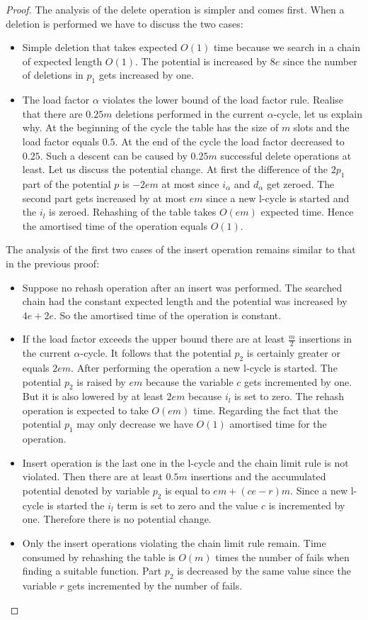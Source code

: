 \begin{proof}
The analysis of the delete operation is simpler and comes first. When a deletion is performed we have to discuss the two cases:
\begin{itemize}
\item Simple deletion that takes expected $O(1)$ time because we search in a chain of expected length $O(1)$. The potential is increased by $8e$ since the number of deletions in $p_1$ gets increased by one.
\item The load factor $\alpha$ violates the lower bound of the load factor rule. Realise that there are $0.25 m$ deletions performed in the current $\alpha$-cycle, let us explain why. At the beginning of the cycle the table has the size of $m$ slots and the load factor equals $0.5$. At the end of the cycle the load factor decreased to $0.25$. Such a descent can be caused by $0.25 m$ successful delete operations at least. Let us discuss the potential change. At first the difference of the $2p_1$ part of the potential $p$ is $-2em$ at most since $i_{\alpha}$ and $d_{\alpha}$ get zeroed. The second part gets increased by at most $em$ since a new l-cycle is started and the $i_l$ is zeroed. Rehashing of the table takes $O(em)$ expected time. Hence the amortised time of the operation equals $O(1)$. 
\end{itemize}

The analysis of the first two cases of the insert operation remains similar to that in the previous proof:
\begin{itemize}
\item Suppose no rehash operation after an insert was performed. The searched chain had the constant expected length and the potential was increased by $4e + 2e$. So the amortised time of the operation is constant.
\item If the load factor exceeds the upper bound there are at least $\frac{m}{2}$ insertions in the current $\alpha$-cycle. It follows that the potential $p_2$ is certainly greater or equals $2em$. After performing the operation a new l-cycle is started. The potential $p_2$ is raised by $em$ because the variable $c$ gets incremented by one. But it is also lowered by at least $2em$ because $i_l$ is set to zero. The rehash operation is expected to take $O(em)$ time. Regarding the fact that the potential $p_1$ may only decrease we have $O(1)$ amortised time for the operation.
\item Insert operation is the last one in the l-cycle and the chain limit rule is not violated. Then there are at least $0.5 m$ insertions and the accumulated potential denoted by variable $p_2$ is equal to $em + (ce - r)m$. Since a new l-cycle is started the $i_l$ term is set to zero and the value $c$ is incremented by one. Therefore there is no potential change.
\item Only the insert operations violating the chain limit rule remain. Time consumed by rehashing the table is $O(m)$ times the number of fails when finding a suitable function. Part $p_2$ is decreased by the same value since the variable $r$ gets incremented by the number of fails. 


\end{itemize}
\end{proof}
